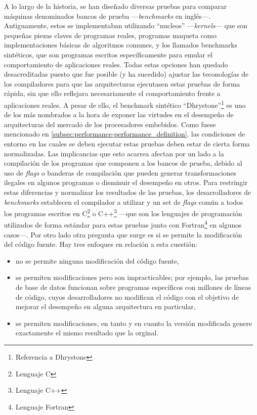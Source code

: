 A lo largo de la historia, se han diseñado diversas pruebas para comparar 
máquinas denominados bancos de prueba ---\emph{benchmarks} en inglés---. 
Antiguamente, estos se implementaban utilizando ``nucleos'' 
---\emph{kernels}--- que son pequeñas piezas claves de programas reales, 
programas maqueta como implementaciones básicas de algoritmos comunes, y los 
llamados benchmarks sintéticos, que son programas escritos específicamente para 
emular el comportamiento de aplicaciones reales. Todas estas opciones han 
quedado desacreditadas puesto que fue posible (y ha sucedido) ajustar las 
teconologías de los compiladores para que las arquitecturas ejecutasen estas 
pruebas de forma rápida, sin que ello reflejara necesariamente el 
comportamiento frente a aplicaciones reales. A pesar de ello, el benchmark 
sintético ``Dhrystone''\footnote{Referencia a Dhrystone} es uno de los más 
nombrados a la hora de exponer las virtudes en el desempeño de arquitecturas 
del mercado de los procesadores embebidos. Como fuese mencionado en 
\ref{subsec:performance-performance_definition}, las condiciones de entorno en 
las cuales se deben ejecutar estas pruebas deben estar de cierta forma 
normalizadas. Las implicancias que esto acarrea afectan por un lado a la 
compilación de los programas que componen a los bancos de prueba, debido al uso 
de \emph{flags} o banderas de compilación que pueden generar transformaciones 
ilegales en algunos programas o disminuir el desempeño en otros. Para 
restringir estas diferencias y normalizar los resultados de las pruebas, los 
desarrolladores de \emph{benchmarks} establecen el compilador a utilizar y un 
set de \emph{flags} común a todos los programas escritos en C\footnote{Lenguaje 
C} o C++\footnote{Lenguaje C++} ---que son los lenguajes de programación 
utilizados de forma estándar para estas pruebas junto con 
Fortran\footnote{Lenguaje Fortran} en algunos casos---. Por otro lado otra 
pregunta que surge es si se permite la modificación del código fuente. Hay tres 
enfoques en relación a esta cuestión:
\begin{itemize}
  \item no se permite ninguna modificación del código fuente,
  \item se permiten modificaciones pero son impracticables; por ejemplo, las 
pruebas de base de datos funcionan sobre programas específicos con millones de 
líneas de código, cuyos desarrolladores no modifican el código con el objetivo 
de mejorar el desempeño en alguna arquitectura en particular,
  \item se permiten modificaciones, en tanto y en cuanto la versión modificada 
genere exactamente el mismo resultado que la orginal.
\end{itemize}
